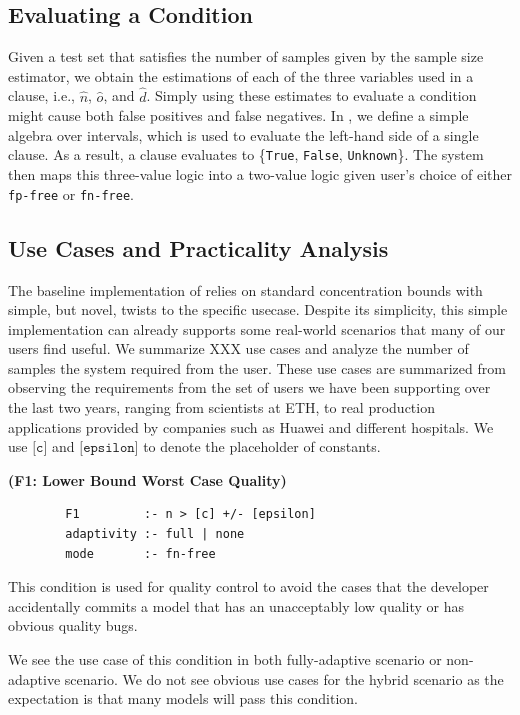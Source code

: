 \documentclass{article}
\begin{document}
\subsection{Evaluating a Condition}

Given a test set that satisfies the number of
samples given by the sample size estimator,
we obtain the estimations of each of the
three variables used in a clause, i.e.,
$\hat{n}$, $\hat{o}$, and $\hat{d}$. Simply
using these estimates to evaluate a condition
might cause both false positives and false negatives.
In \sys, we define a simple algebra over
intervals, which is used to evaluate the left-hand
side of a single clause. As a result, a clause
evaluates to \{\texttt{True}, \texttt{False}, 
\texttt{Unknown}\}. The system then maps
this three-value logic into a two-value logic
given user's choice of either \texttt{fp-free}
or \texttt{fn-free}. 

\subsection{Use Cases and Practicality Analysis}

The baseline implementation of \sys relies on 
standard concentration bounds with simple,
but novel, twists to the specific usecase. 
Despite its simplicity, this simple implementation
can already supports some real-world scenarios 
that many of our users find useful. We summarize 
XXX use cases and analyze the number of samples 
the system required from the user. These 
use cases are summarized from observing the 
requirements from the set of users we have been 
supporting over the last two years, ranging from
scientists at ETH, to real production applications
provided by companies such as Huawei and different 
hospitals. We use $\texttt{[c]}$ and $\texttt{[epsilon]}$
to denote the placeholder of constants.

\vspace{1em}
\noindent 
{\bf (F1: Lower Bound Worst Case Quality)}
\begin{verbatim}
        F1         :- n > [c] +/- [epsilon]
        adaptivity :- full | none
        mode       :- fn-free
\end{verbatim}
This condition is used for quality control to avoid
the cases that the developer accidentally commits a
model that has an unacceptably low quality or
has obvious quality bugs.

We see the use case of this condition in both
fully-adaptive scenario or non-adaptive scenario. We 
do not see obvious use cases for the hybrid scenario
as the expectation is that many models will pass
this condition.
\end{document}
